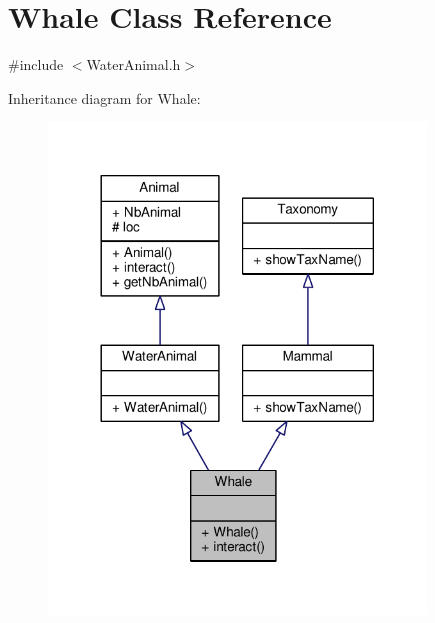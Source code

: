 \hypertarget{classWhale}{}\section{Whale Class Reference}
\label{classWhale}


{\ttfamily \#include $<$Water\+Animal.\+h$>$}



Inheritance diagram for Whale\+:
\nopagebreak
\begin{figure}[H]
\begin{center}
\leavevmode
\includegraphics[width=284pt]{classWhale__inherit__graph}
\end{center}
\end{figure}


